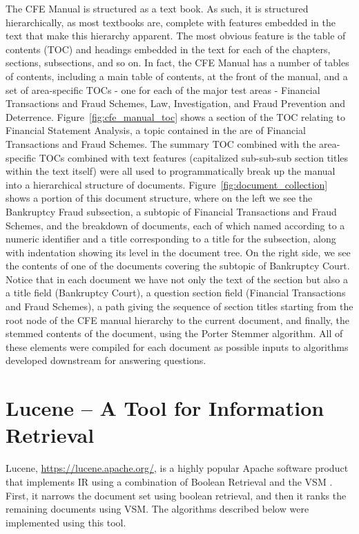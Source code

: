 The CFE Manual is structured as a text book. As such, it is structured hierarchically, as most textbooks are, complete with features embedded in the text that make this hierarchy apparent.  The most obvious feature is the table of contents (TOC) and headings embedded in the text for each of the chapters, sections, subsections, and so on.  In fact, the CFE Manual has a number of tables of contents, including a main table of contents, at the front of the manual, and a set of area-specific TOCs - one for each of the major test areas - Financial Transactions and Fraud Schemes, Law, Investigation, and Fraud Prevention and Deterrence.  Figure~\ref{fig:cfe_manual_toc} shows a section of the TOC relating to Financial Statement Analysis, a topic contained in the are of Financial Transactions and Fraud Schemes.  The summary TOC combined with the area-specific TOCs combined with text features (capitalized sub-sub-sub section titles within the text itself) were all used to programmatically break up the manual into a hierarchical structure of documents.  Figure~\ref{fig:document_collection} shows a portion of this document structure, where on the left we see the Bankruptcy Fraud subsection, a subtopic of Financial Transactions and Fraud Schemes, and the breakdown of documents, each of which named according to a numeric identifier and a title corresponding to a title for the subsection, along with indentation showing its level in the document tree.  On the right side, we see the contents of one of the documents covering the subtopic of Bankruptcy Court.  Notice that in each document we have not only the text of the section but also a a title field (Bankruptcy Court), a question section field (Financial Transactions and Fraud Schemes), a path giving the sequence of section titles starting from the root node of the CFE manual hierarchy to the current document, and finally, the stemmed contents of the document, using the Porter Stemmer algorithm.  All of these elements were compiled for each document as possible inputs to algorithms developed downstream for answering questions.  

\section{Lucene -- A Tool for Information Retrieval}

Lucene, \url{https://lucene.apache.org/}, is a highly popular Apache software product that implements IR using a combination of Boolean Retrieval and the VSM \cite{McCandless:2010:LAS:1893016_ch1,McCandless:2010:LAS:1893016_ch2,McCandless:2010:LAS:1893016_ch3,McCandless:2010:LAS:1893016_ch4}.  First, it narrows the document set using boolean retrieval, and then it ranks the remaining documents using VSM.  The algorithms described below were implemented using this tool.  

